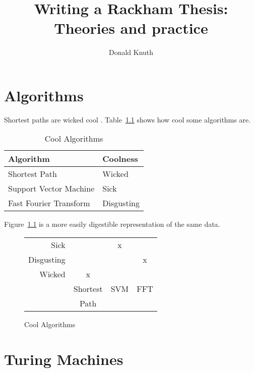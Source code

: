 \documentclass[doublespace]{rackham-thesis}
\begin{document}
\title{Writing a Rackham Thesis: Theories and practice}
\author{Donald Knuth}

\maketitle

\tableofcontents
\listoffigures
\listoftables
\listofappendices

\chapter{Algorithms}

Shortest paths are wicked cool \parencite{dijkstra}.
Table~\ref{tab:alg} shows how cool some algorithms are.
\lipsum[1]

\begin{table}
    \centering
    \caption{Cool Algorithms}
    \begin{tabular}{ll} \toprule
        Algorithm & Coolness \\ \midrule
        Shortest Path & Wicked \\
        Support Vector Machine & Sick \\
        Fast Fourier Transform & Disgusting \\ \bottomrule
    \end{tabular}
    \label{tab:alg}
\end{table}

Figure~\ref{fig:alg} is a more easily digestible representation of the same data.
\lipsum[2-3]

\begin{figure}
    \centering
    \begin{tabular}{r|ccc}
        Sick & & x \\
        Disgusting & & & x \\
        Wicked & x \\ \hline
        & Shortest & SVM & FFT \\
        & Path \\
    \end{tabular}
    \caption{Cool Algorithms}
    \label{fig:alg}
\end{figure}


\chapter{Turing Machines}
\end{document}
